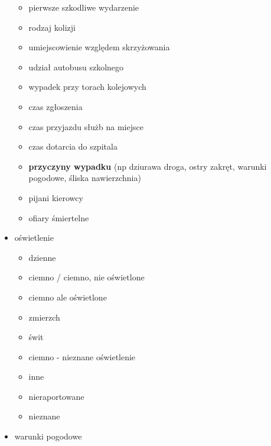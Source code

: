 \begin{itemize}
  \begin{itemize}
  \itemsep-14pt\parskip0pt
  \item
    pierwsze szkodliwe wydarzenie\\
  \item
    rodzaj kolizji\\
  \item
    umiejscowienie względem skrzyżowania\\
  \item
    udział autobusu szkolnego\\
  \item
    wypadek przy torach kolejowych\\
  \item
    czas zgłoszenia\\
  \item
    czas przyjazdu służb na miejsce\\
  \item
    czas dotarcia do szpitala\\
  \item
    \textbf{przyczyny wypadku} (np dziurawa droga, ostry zakręt, warunki
    pogodowe, śliska nawierzchnia)\\
  \item
    pijani kierowcy\\
  \item
    ofiary śmiertelne\\
  \end{itemize}
\item
  oświetlenie

  \begin{itemize}
  \itemsep-14pt\parskip0pt
  \item
    dzienne\\
  \item
    ciemno / ciemno, nie oświetlone\\
  \item
    ciemno ale oświetlone\\
  \item
    zmierzch\\
  \item
    świt\\
  \item
    ciemno - nieznane oświetlenie\\
  \item
    inne\\
  \item
    nieraportowane\\
  \item
    nieznane\\
  \end{itemize}
\item
  warunki pogodowe


\end{itemize}

